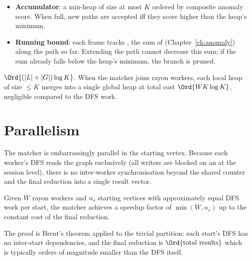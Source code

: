 \begin{itemize}
    \item \textbf{Accumulator}: a min-heap of size at most $K$
        ordered by composite anomaly score. When full, new paths
        are accepted iff they score higher than the heap's minimum.
    \item \textbf{Running bound}: each frame tracks
        , the sum of
         (Chapter~\ref{ch:anomaly}) along
        the path so far. Extending the path cannot decrease this
        sum; if the sum already falls below the heap's minimum,
        the branch is pruned.
\end{itemize}

\begin{algorithm}
\caption{\textsc{Merge-Into-TopK}}\label{alg:merge-topk}
\end{algorithm}

\begin{complexity}
$\Ord{(|L| + |G|) \log K}$. When the matcher joins rayon workers,
each local heap of size $\leq K$ merges into a single global heap
at total cost $\Ord{W K \log K}$, negligible compared to the DFS
work.
\end{complexity}

\section{Parallelism}

The matcher is embarrassingly parallel in the starting vertex.
Because each worker's DFS reads the graph exclusively (all writers
are blocked on an  at the session level), there
is no inter-worker synchronisation beyond the shared 
counter and the final reduction into a single result vector.

\begin{theorem}
Given $W$ rayon workers and $n_s$ starting vertices with
approximately equal DFS work per start, the matcher achieves a
speedup factor of $\min(W, n_s)$ up to the constant cost of the
final reduction.
\end{theorem}

The proof is Brent's theorem applied to the trivial partition: each
start's DFS has no inter-start dependencies, and the final
reduction is $\Ord{\text{total results}}$ which is typically orders
of magnitude smaller than the DFS itself.

